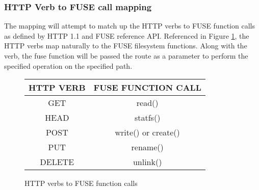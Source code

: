 \subsubsection{HTTP Verb to FUSE call mapping}
The mapping will attempt to match up the HTTP verbs to FUSE function calls as defined by HTTP 1.1 and FUSE reference API. Referenced in Figure \ref{fig:httpverbs}, the HTTP verbs map naturally to the FUSE filesystem functions. Along with the verb, the fuse function will be passed the route as a parameter to perform the specified operation on the specified path.   
\begin{figure}[H]
\centering
\begin{tabular}{|c|c|}
\hline
HTTP VERB & FUSE FUNCTION CALL \\\hline

GET & read()\\

HEAD & statfs() \\

POST  & write() or create() \\

PUT & rename() \\

DELETE & unlink() \\\hline


\end{tabular}

\caption{HTTP verbs to FUSE function calls}\label{fig:httpverbs}
\end{figure}


